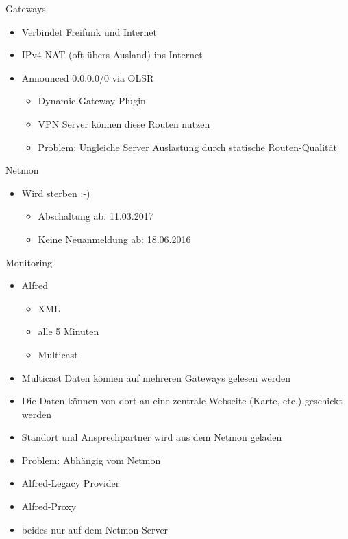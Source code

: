 \begin{frame}{Gateways}
    \begin{itemize}
        \item Verbindet Freifunk und Internet
        \item IPv4 NAT (oft übers Ausland) ins Internet
        \item Announced 0.0.0.0/0 via OLSR
        \begin{itemize}
            \item Dynamic Gateway Plugin
            \item VPN Server können diese Routen nutzen
            \item Problem: Ungleiche Server Auslastung durch statische Routen-Qualität
        \end{itemize}
    \end{itemize}
\end{frame}

\begin{frame}{Netmon}
    \begin{itemize}
        \item Wird sterben :-)
        \begin{itemize}
            \item Abschaltung ab: 11.03.2017
            \item Keine Neuanmeldung ab: 18.06.2016
        \end{itemize}
    \end{itemize}
\end{frame}

\begin{frame}{Monitoring}
    \begin{itemize}
        \item Alfred
        \begin{itemize}
            \item XML
            \item alle 5 Minuten
            \item Multicast
        \end{itemize}
        \item Multicast Daten können auf mehreren Gateways gelesen werden
        \item Die Daten können von dort an eine zentrale Webseite (Karte, etc.) geschickt werden
        \item Standort und Ansprechpartner wird aus dem Netmon geladen
        \item Problem: Abhängig vom Netmon
    \end{itemize}
    \begin{itemize}
        \item Alfred-Legacy Provider
        \item Alfred-Proxy
        \item beides nur auf dem Netmon-Server
    \end{itemize}
\end{frame}

